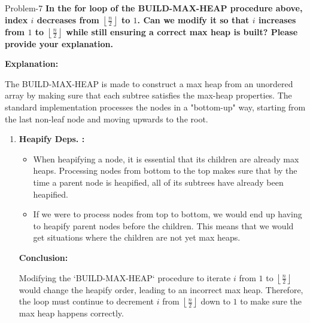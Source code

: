 \begin{problem}{}{Problem-7}
	\textbf{In the for loop of the BUILD-MAX-HEAP procedure above, index \( i \) decreases from \( \left\lfloor \frac{n}{2} \right\rfloor \) to \( 1 \). Can we modify it so that \( i \) increases from \( 1 \) to \( \left\lfloor \frac{n}{2} \right\rfloor \) while still ensuring a correct max heap is built? Please provide your explanation.}
	
	\textbf{Explanation:}
	
	The BUILD-MAX-HEAP is made to construct a max heap from an unordered array by making sure that each subtree satisfies the max-heap properties. The standard implementation processes the nodes in a "bottom-up" way, starting from the last non-leaf node and moving upwards to the root. 
	
	\begin{enumerate}
		\item \textbf{Heapify Deps. :}
		\begin{itemize}
			\item When heapifying a node, it is essential that its children are already max heaps. Processing nodes from bottom to the top makes sure that by the time a parent node is heapified, all of its subtrees have already been heapified. 
			\item If we were to process nodes from top to bottom, we would end up having to heapify parent nodes before the children. This means that we would get situations where the children are not yet max heaps.
		\end{itemize}
	
	\textbf{Conclusion:}
	
	Modifying the `BUILD-MAX-HEAP` procedure to iterate \( i \) from \( 1 \) to \( \left\lfloor \frac{n}{2} \right\rfloor \) would change the heapify order, leading to an incorrect max heap. Therefore, the loop must continue to decrement \( i \) from \( \left\lfloor \frac{n}{2} \right\rfloor \) down to \( 1 \) to make sure the max heap happens correctly.
\end{enumerate}
\end{problem}

